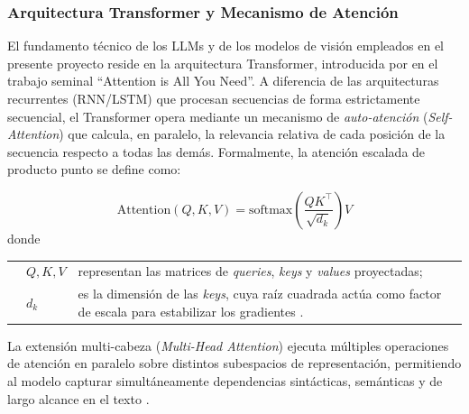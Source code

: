 \subsubsection{Arquitectura Transformer y Mecanismo de Atención}

El fundamento técnico de los LLMs y de los modelos de visión empleados en el presente 
proyecto reside en la arquitectura Transformer, introducida por \textcite{Vaswani2017} 
en el trabajo seminal ``Attention is All You Need''. A diferencia de las arquitecturas 
recurrentes (RNN/LSTM) que procesan secuencias de forma estrictamente secuencial, el 
Transformer opera mediante un mecanismo de \textit{auto-atención} (\textit{Self-Attention}) 
que calcula, en paralelo, la relevancia relativa de cada posición de la secuencia respecto 
a todas las demás. Formalmente, la atención escalada de producto punto se define como:

\begin{equation}
    \text{Attention}(Q, K, V) = \text{softmax}\!\left(\frac{QK^\top}{\sqrt{d_k}}\right)V
\end{equation}
\noindent donde

\noindent\begin{tabular}{@{} p{1cm} l p{8.0cm} @{}}
  & $Q, K, V$ & representan las matrices de \textit{queries}, \textit{keys} y \textit{values} proyectadas; \\
  & $d_k$ & es la dimensión de las \textit{keys}, cuya raíz cuadrada actúa como factor de escala para estabilizar los gradientes \parencite{Vaswani2017}.
\end{tabular}

La extensión multi-cabeza (\textit{Multi-Head Attention}) ejecuta múltiples operaciones de atención en paralelo sobre distintos subespacios de representación, permitiendo al modelo capturar simultáneamente dependencias sintácticas, semánticas y de largo alcance en el texto \parencite{Vaswani2017}.

